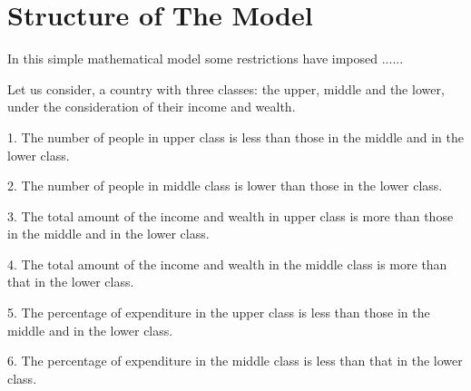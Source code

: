 \documentclass[12pt,a4paper]{article}
\begin{document}
  \section{Structure of The Model}
	In this simple mathematical model some restrictions have imposed ......   
	
	Let us consider, a country with three classes: the upper, middle and the lower, under the consideration of their income and wealth.
     
    1. The number of people in upper class is less than those in the middle and in the lower class.
    
    2. The number of people in middle class is lower than those in the lower class.
    
    3. The total amount of the income and wealth in upper class is more than those in the middle and in the lower class.
    
    4. The total amount of the income and wealth in the middle class is more than that in the lower class. 
    
    5. The percentage of expenditure in the upper class is less than those in the middle and in the lower class.
    
    6. The percentage of expenditure in the middle class is less than that in the lower class.		
		
			
\end{document}
